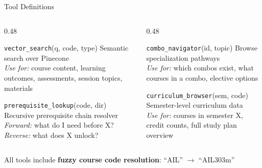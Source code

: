 \documentclass[aspectratio=169,10pt]{beamer}
\begin{document}
\begin{frame}{Tool Definitions}

\begin{columns}[T]
\begin{column}{0.48\textwidth}

\begin{block}{\texttt{vector\_search}(q, code, type)}
Semantic search over Pinecone\\
\footnotesize
\textit{Use for:} course content, learning outcomes, assessments, session topics, materials
\end{block}

\vspace{0.3em}

\begin{block}{\texttt{prerequisite\_lookup}(code, dir)}
Recursive prerequisite chain resolver\\
\footnotesize
\textit{Forward:} what do I need before X?\\
\textit{Reverse:} what does X unlock?
\end{block}

\end{column}
\begin{column}{0.48\textwidth}

\begin{block}{\texttt{combo\_navigator}(id, topic)}
Browse specialization pathways\\
\footnotesize
\textit{Use for:} which combos exist, what courses in a combo, elective options
\end{block}

\vspace{0.3em}

\begin{block}{\texttt{curriculum\_browser}(sem, code)}
Semester-level curriculum data\\
\footnotesize
\textit{Use for:} courses in semester X, credit counts, full study plan overview
\end{block}

\end{column}
\end{columns}

\vspace{0.5em}
All tools include \textbf{fuzzy course code resolution}: ``AIL'' $\rightarrow$ ``AIL303m''

\end{frame}
\end{document}
